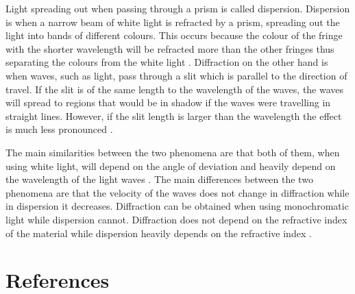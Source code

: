 \documentclass[12pt, a4paper]{article}
\begin{document}
\medskip
\noindent
Light spreading out when passing through a prism is called dispersion. Dispersion is when a narrow beam of white light is refracted by a prism, spreading out the light into bands of different colours. This occurs because the colour of the fringe with the shorter wavelength will be refracted more than the other fringes thus separating the colours from the white light \parencite{muncaster}. Diffraction on the other hand is when waves, such as light, pass through a slit which is parallel to the direction of travel. If the slit is of the same length to the wavelength of the waves, the waves will spread to regions that would be in shadow if the waves were travelling in straight lines. However, if the slit length is larger than the wavelength the effect is much less pronounced \parencite{muncaster}. 

\medskip
\noindent
The main similarities between the two phenomena are that both of them, when using white light, will depend on the angle of deviation and heavily depend on the wavelength of the light waves \parencite{hecht_2017}. The main differences between the two phenomena are that the velocity of the waves does not change in diffraction while in dispersion it decreases. Diffraction can be obtained when using monochromatic light while dispersion cannot. Diffraction does not depend on the refractive index of the material while dispersion heavily depends on the refractive index \parencite{hecht_2017}.

\section*{References}
\printbibliography[heading=none]
\end{document}
